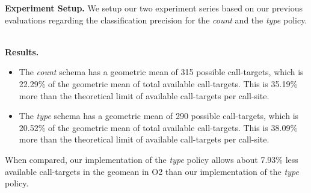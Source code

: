 \textbf{Experiment Setup.} We setup our two experiment series based on our previous evaluations regarding the classification precision for the \textit{count} and the \textit{type} policy.

~\\
\textbf{Results.}
\begin{itemize}
\item The \textit{count} schema has a geometric mean of 315 possible call-targets, which is 22.29\% of the geometric mean of total available 
call-targets. This is 35.19\% more than the theoretical limit of available call-targets per call-site.
\item The \textit{type} schema has a geometric mean of 290 possible call-targets, which is 20.52\% of the geometric mean of total available
call-targets. This is 38.09\% more than the theoretical limit of available call-targets per call-site.
\end{itemize}

When compared, our implementation of the \textit{type} policy allows about 7.93\% less available call-targets in the geomean in O2 than our implementation of the \textit{type} policy.


